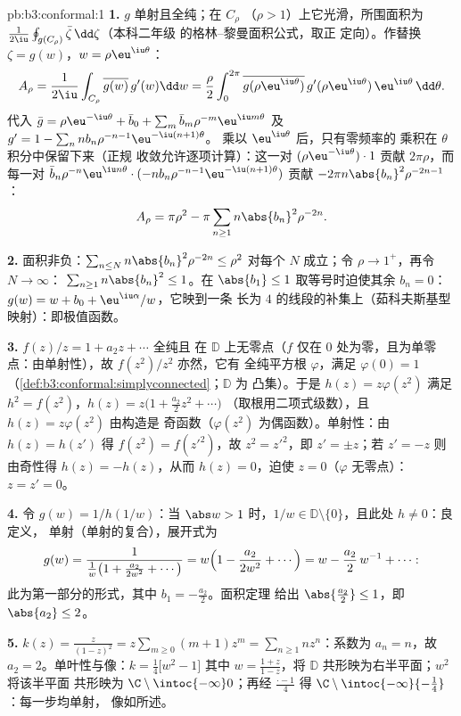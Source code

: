 \begin{solution}{pb:b3:conformal:1}
\textbf{1.} $g$ 单射且全纯；在 $C_\rho$
（$\rho > 1$）上它光滑，所围面积为
$\frac1{2\iu}\oint_{g(C_\rho)}\bar\zeta\,\dd\zeta$（本科二年级
的格林--黎曼面积公式，取正
定向）。作替换 $\zeta = g(w)$，$w =
\rho\eu^{\iu\theta}$：
\[
A_\rho = \frac1{2\iu}\int_{C_\rho}\overline{g(w)}\,g'(w)\dd
w = \frac\rho2\int_0^{2\pi}\overline{g(\rho\eu^{\iu\theta})}
\,g'(\rho\eu^{\iu\theta})\,\eu^{\iu\theta}\,\dd\theta .
\]
代入 $\bar g = \rho\eu^{-\iu\theta} + \bar b_0 +
\sum_m\bar b_m\rho^{-m}\eu^{\iu m\theta}$ 及 $g' = 1 -
\sum_nnb_n\rho^{-n-1}\eu^{-\iu(n+1)\theta}$。
乘以 $\eu^{\iu\theta}$ 后，只有零频率的
乘积在 $\theta$ 积分中保留下来（正规
收敛允许逐项计算）：这一对
$(\rho\eu^{-\iu\theta})\cdot1$ 贡献 $2\pi\rho$，而
每一对 $\bar b_n\rho^{-n}\eu^{\iu
n\theta}\cdot(-nb_n\rho^{-n-1}\eu^{-\iu(n+1)\theta})$
贡献 $-2\pi n\abs{b_n}^2\rho^{-2n-1}$：
\[
A_\rho = \pi\rho^2 - \pi\sum_{n\geq1}n\abs{b_n}^2\rho^{-2n}.
\]

\textbf{2.} 面积非负：$\sum_{n\leq
N}n\abs{b_n}^2\rho^{-2n} \leq \rho^2$ 对每个 $N$ 成立；令
$\rho \to 1^+$，再令 $N \to \infty$：
$\sum_{n\geq1}n\abs{b_n}^2 \leq 1$。在 $\abs{b_1}
\leq 1$ 取等号时迫使其余 $b_n = 0$：$g(w) = w + b_0 +
\eu^{\iu\alpha}/w$，它映到一条
长为 $4$ 的线段的补集上（茹科夫斯基型映射）：即极值函数。

\textbf{3.} $f(z)/z = 1 + a_2z + \cdots$ 全纯且
在 $\mathbb D$ 上无零点（$f$ 仅在 $0$ 处为零，且为单零
点：由单射性），故 $f(z^2)/z^2$ 亦然，它有
全纯平方根 $\varphi$，满足 $\varphi(0) = 1$
（\cref{def:b3:conformal:simplyconnected}；$\mathbb D$ 为
凸集）。于是 $h(z) = z\varphi(z^2)$ 满足 $h^2 =
f(z^2)$，$h(z) = z\bigl(1 + \frac{a_2}2z^2 + \cdots\bigr)$
（取根用二项式级数），且 $h(z) = z\varphi(z^2)$ 由构造是
奇函数（$\varphi(z^2)$ 为偶函数）。单射性：由 $h(z) = h(z')$ 得 $f(z^2) =
f(z'^2)$，故 $z^2 = z'^2$，即 $z' = \pm z$；若 $z' = -z$
则由奇性得 $h(z) = -h(z)$，从而 $h(z) = 0$，迫使 $z
= 0$（$\varphi$ 无零点）：$z = z' = 0$。

\textbf{4.} 令 $g(w) = 1/h(1/w)$：当 $\abs w > 1$ 时，$1/w \in
\mathbb D\setminus\{0\}$，且此处 $h \neq 0$：良定义，
单射（单射的复合），展开式为
\[
g(w) = \frac{1}{\frac1w\bigl(1 + \frac{a_2}{2w^2} +
\cdots\bigr)} = w\Bigl(1 - \frac{a_2}{2w^2} + \cdots\Bigr)
= w - \frac{a_2}{2}\,w^{-1} + \cdots :
\]
此为第一部分的形式，其中 $b_1 = -\frac{a_2}2$。面积定理
给出 $\abs{\frac{a_2}2} \leq 1$，即 $\abs{a_2} \leq 2$。

\textbf{5.} $k(z) = \frac z{(1-z)^2} = z\sum_{m\geq0}(m +
1)z^m = \sum_{n\geq1}nz^n$：系数为 $a_n = n$，故 $a_2 =
2$。单叶性与像：$k = \frac14\bigl[w^2 - 1\bigr]$
其中 $w = \frac{1 + z}{1 - z}$，将 $\mathbb D$
共形映为右半平面；$w^2$ 将该半平面
共形映为 $\C\setminus\intoc{-\infty}0$；再经
$\frac{\cdot - 1}4$ 得
$\C\setminus\intoc{-\infty}{-\frac14}$：每一步均单射，
像如所述。


\end{solution}
